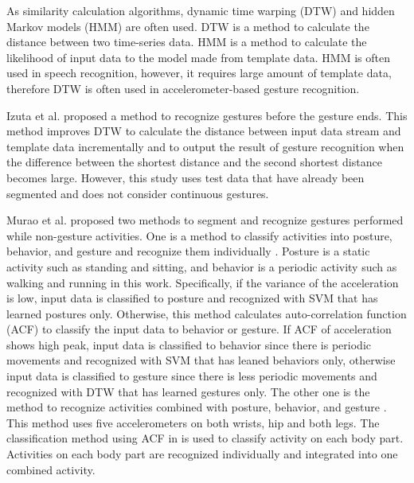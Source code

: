 \documentclass{sigchi-ext}
\begin{document}
        As similarity calculation algorithms, dynamic time warping (DTW) \cite{dtw} and hidden Markov models (HMM) \cite{hmm} are often used. DTW is a method to calculate the distance between two time-series data. HMM is a method to calculate the likelihood of input data to the model made from template data. HMM is often used in speech recognition, however, it requires large amount of template data, therefore DTW is often used in accelerometer-based gesture recognition.

        Izuta et al. \cite{izuta} proposed a method to recognize gestures before the gesture ends. This method improves DTW to calculate the distance between input data stream and template data incrementally and to output the result of gesture recognition when the difference between the shortest distance and the second shortest distance becomes large. However, this study uses test data that have already been segmented and does not consider continuous gestures.
        
        Murao et al. proposed two methods to segment and recognize gestures performed while non-gesture activities. One is a method to classify activities into posture, behavior, and gesture and recognize them individually \cite{murao-const}. Posture is a static activity such as standing and sitting, and behavior is a periodic activity such as walking and running in this work. Specifically, if the variance of the acceleration is low, input data is classified to posture and recognized with SVM that has learned postures only. Otherwise, this method calculates auto-correlation function (ACF) to classify the input data to behavior or gesture. If ACF of acceleration shows high peak, input data is classified to behavior since there is periodic movements and recognized with SVM that has leaned behaviors only, otherwise input data is classified to gesture since there is less periodic movements and recognized with DTW that has learned gestures only. The other one is the method to recognize activities combined with posture, behavior, and gesture \cite{murao-comb}. This method uses five accelerometers on both wrists, hip and both legs. The classification method using ACF in \cite{murao-const} is used to classify activity on each body part. Activities on each body part are recognized individually and integrated into one combined activity. 
        
\end{document}
